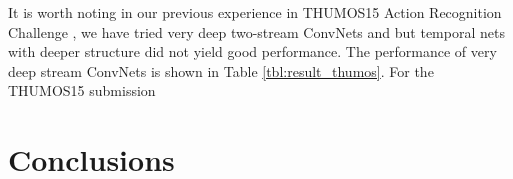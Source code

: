 \documentclass[10pt,twocolumn,letterpaper]{article}
\begin{document}
It is worth noting in our previous experience \cite{WangWXQ15} in THUMOS15 Action Recognition Challenge \cite{THUMOS15}, we have tried very deep two-stream ConvNets and but temporal nets with deeper structure did not yield good performance. The performance of very deep stream ConvNets is shown in Table \ref{tbl:result_thumos}. For the THUMOS15 submission

\begin{table}
\begin{center}
\vspace{2mm}
\caption{Performance comparison with the state of the art on UCF101 dataset.}
\end{center}
\end{table}

\section{Conclusions}
\label{sec:conclusion}

{


}
\end{document}
